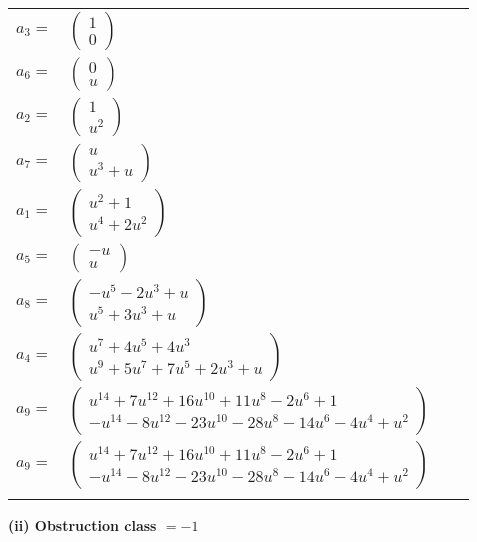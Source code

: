 \documentclass[1p]{elsarticle_modified}
\theoremstyle{definition}
\begin{document}
\begin{tabular}{m{7pt} m{180pt} m{7pt} m{180pt} }
\flushright $a_{3}=$&$\begin{pmatrix}1\\0\end{pmatrix}$ \\
\flushright $a_{6}=$&$\begin{pmatrix}0\\u\end{pmatrix}$ \\
\flushright $a_{2}=$&$\begin{pmatrix}1\\u^2\end{pmatrix}$ \\
\flushright $a_{7}=$&$\begin{pmatrix}u\\u^3+u\end{pmatrix}$ \\
\flushright $a_{1}=$&$\begin{pmatrix}u^2+1\\u^4+2 u^2\end{pmatrix}$ \\
\flushright $a_{5}=$&$\begin{pmatrix}- u\\u\end{pmatrix}$ \\
\flushright $a_{8}=$&$\begin{pmatrix}- u^5-2 u^3+u\\u^5+3 u^3+u\end{pmatrix}$ \\
\flushright $a_{4}=$&$\begin{pmatrix}u^7+4 u^5+4 u^3\\u^9+5 u^7+7 u^5+2 u^3+u\end{pmatrix}$ \\
\flushright $a_{9}=$&$\begin{pmatrix}u^{14}+7 u^{12}+16 u^{10}+11 u^8-2 u^6+1\\- u^{14}-8 u^{12}-23 u^{10}-28 u^8-14 u^6-4 u^4+u^2\end{pmatrix}$\\ \flushright $a_{9}=$&$\begin{pmatrix}u^{14}+7 u^{12}+16 u^{10}+11 u^8-2 u^6+1\\- u^{14}-8 u^{12}-23 u^{10}-28 u^8-14 u^6-4 u^4+u^2\end{pmatrix}$\\&\end{tabular}
\flushleft \textbf{(ii) Obstruction class $= -1$}\\~\\
\end{document}
